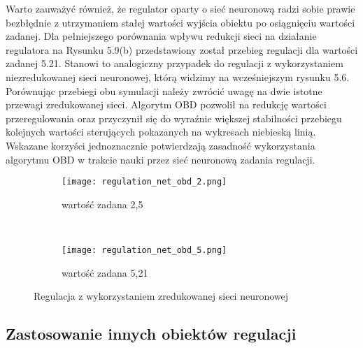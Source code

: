 \par Warto zauważyć również, że regulator oparty o sieć neuronową radzi sobie prawie bezbłędnie z utrzymaniem stałej wartości wyjścia obiektu po osiągnięciu wartości zadanej. Dla pełniejszego porównania wpływu redukcji sieci na działanie regulatora na Rysunku 5.9(b) przedstawiony został przebieg regulacji dla wartości zadanej 5.21. Stanowi to analogiczny przypadek do regulacji z wykorzystaniem niezredukowanej sieci neuronowej, którą widzimy na wcześniejszym rysunku 5.6. Porównując przebiegi obu symulacji należy zwrócić uwagę na dwie istotne przewagi zredukowanej sieci. Algorytm OBD pozwolił na redukcję wartości przeregulowania oraz przyczynił się do wyraźnie większej stabilności przebiegu kolejnych wartości sterujących pokazanych na wykresach niebieską linią. Wskazane korzyści jednoznacznie potwierdzają zasadność wykorzystania algorytmu OBD w trakcie nauki przez sieć neuronową zadania regulacji.
 
\begin{figure}[!htb]
    \centering
    \begin{subfigure}[t]{0.5\textwidth}
        \centering
        \texttt{[image: regulation\_net\_obd\_2.png]}
        \caption{wartość zadana 2,5}
    \end{subfigure}%
    ~ 
    \begin{subfigure}[t]{0.5\textwidth}
        \centering
        \texttt{[image: regulation\_net\_obd\_5.png]}
        \caption{wartość zadana 5,21}
    \end{subfigure}
    \caption{Regulacja z wykorzystaniem zredukowanej sieci neuronowej}
\end{figure}


\subsection{Zastosowanie innych obiektów regulacji}

